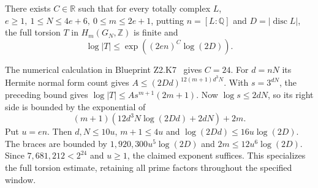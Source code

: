 
\begin{formalstatement}\label{pn:P039}
There exists \(C\in\mathbb R\) such that for every totally complex \(L\),
\(e\ge1,\ 1\le N\le4e+6,\ 0\le m\le2e+1\), putting
\(n=[L:\mathbb Q]\) and \(D=|\operatorname{disc} L|\), the full torsion
\(T\) in \(H_m(G_N,\mathbb Z)\) is finite and
\[
          \log |T|\le \exp\!\left((2en)^C\log(2D)\right).
\]
\end{formalstatement}
\begin{outline}
The numerical calculation in Blueprint Z2.K7~ gives \(C=24\).
For \(d=nN\) its Hermite normal form count gives
\(A\le(2Dd)^{12(m+1)d^3N}\). With \(s=3^{dN}\), the preceding
bound gives \(\log|T|\le As^{m+1}(2m+1)\). Now
\(\log s\le 2dN\), so its right side is bounded by the exponential of
\[
 (m+1)\left(12d^3N\log(2Dd)+2dN\right)+2m .
\]
Put \(u=en\). Then \(d,N\le10u\), \(m+1\le4u\) and
\(\log(2Dd)\le16u\log(2D)\). The braces are bounded by
\(1{,}920{,}300u^5\log(2D)\) and \(2m\le12u^6\log(2D)\).
Since \(7{,}681{,}212<2^{24}\) and \(u\ge1\), the claimed
exponent suffices. This specializes the full torsion estimate,
retaining all prime factors throughout the specified window.
\end{outline}
